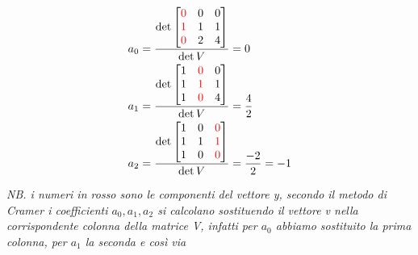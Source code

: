 \documentclass[a4paper, portrait]{book}
\numberwithin{equation}{chapter} %
\begin{document}
\begin{align}
    &a_0 = \frac{\det \begin{bmatrix}
        \color{red}{0}&0&0\\
        \color{red}{1}&1&1\\
        \color{red}{0}&2&4
    \end{bmatrix}}{\det V} = 0\\
    &a_1 = \frac{\det \begin{bmatrix}
        1&\color{red}{0}&0\\
        1&\color{red}{1}&1\\
        1&\color{red}{0}&4
    \end{bmatrix}}{\det V} = \frac{4}{2}\\
    &a_2 = \frac{\det \begin{bmatrix}
        1&0&\color{red}{0}\\
        1&1&\color{red}{1}\\
        1&0&\color{red}{0}
    \end{bmatrix}}{\det V} = \frac{-2}{2} = -1
\end{align}
\begin{center}
    \textit{NB. i numeri in rosso sono le componenti del vettore y, secondo il metodo di Cramer i coefficienti $a_0,a_1,a_2$ si calcolano sostituendo il vettore v nella corrispondente colonna della matrice V, infatti per $a_0$ abbiamo sostituito la prima colonna, per $a_1$ la seconda e così via}
\end{center}
\end{document}
